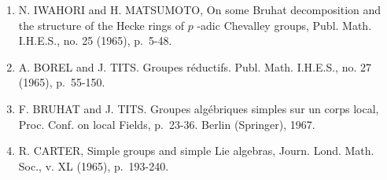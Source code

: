 \begin{enumerate}
\item
  N. IWAHORI and H. MATSUMOTO, On some Bruhat decomposition and the structure of the Hecke rings of \(p\) -adic Chevalley groups, Publ. Math. I.H.E.S., no. 25 (1965), p.~5-48.
\item
  A. BOREL and J. TITS. Groupes réductifs. Publ. Math. I.H.E.S., no. 27 (1965), p.~55-150.
\item
  F. BRUHAT and J. TITS. Groupes algébriques simples sur un corps local, Proc. Conf. on local Fields, p.~23-36. Berlin (Springer), 1967.
\item
  R. CARTER, Simple groups and simple Lie algebras, Journ. Lond. Math. Soc., v. XL (1965), p.~193-240.
\end{enumerate}


